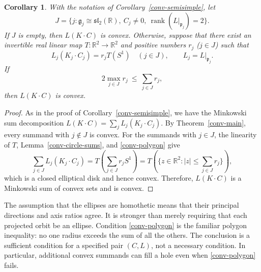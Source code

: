 \documentclass[11pt,reqno]{amsart}
\newtheorem{corollary}[theorem]{Corollary}
\theoremstyle{remark}
\newcommand{\R}{\mathbb R}
\newcommand{\gfr}{\mathfrak g}
\newcommand{\pfr}{\mathfrak p}
\begin{document}
\begin{corollary}\label{conv-exceptional-filling}
With the notation of Corollary~\ref{conv-semisimple}, let
\[
 J=\{j:\gfr_j\cong\mathfrak{sl}_2(\R),\ C_j\ne0,
                 \ \operatorname{rank}(L|_{\pfr_j})=2\}.
\]
If $J$ is empty, then $L(K\cdot C)$ is convex. Otherwise, suppose that
there exist an invertible real linear map $T:\R^2\to\R^2$ and positive
numbers $r_j$ ($j\in J$) such that
\[
 L_j(K_j\cdot C_j)=r_jT(S^1)\quad(j\in J),
 \qquad L_j=L|_{\pfr_j}.
\]
If
\begin{equation}\label{conv-polygon}
 2\max_{j\in J}r_j\ \le\ \sum_{j\in J}r_j,
\end{equation}
then $L(K\cdot C)$ is convex.
\end{corollary}
\begin{proof}
As in the proof of Corollary~\ref{conv-semisimple}, we have the
Minkowski sum decomposition $L(K\cdot C)=\sum_j L_j(K_j\cdot C_j)$. By
Theorem~\ref{conv-main}, every summand with $j\notin J$ is convex. For
the summands with $j\in J$, the linearity of $T$,
Lemma~\ref{conv-circle-sums}, and \eqref{conv-polygon} give
\[
 \sum_{j\in J}L_j(K_j\cdot C_j)
   =T\left(\sum_{j\in J}r_jS^1\right)
   =T\left(\{z\in\R^2:|z|\le\sum_{j\in J}r_j\}\right),
\]
which is a closed elliptical disk and hence convex. Therefore,
$L(K\cdot C)$ is a Minkowski sum of convex sets and is convex.
\end{proof}

The assumption that the ellipses are homothetic means that their
principal directions and axis ratios agree. It is stronger than merely
requiring that each projected orbit be an ellipse. Condition
\eqref{conv-polygon} is the familiar polygon inequality: no one radius
exceeds the sum of all the others. The conclusion is a sufficient
condition for a specified pair $(C,L)$, not a necessary condition. In
particular, additional convex summands can fill a hole even when
\eqref{conv-polygon} fails.
\end{document}
